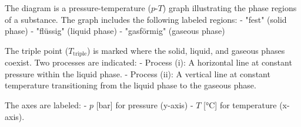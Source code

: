 The diagram is a pressure-temperature (\( p \)-\( T \)) graph illustrating the phase regions of a substance. The graph includes the following labeled regions:  
- "fest" (solid phase)  
- "flüssig" (liquid phase)  
- "gasförmig" (gaseous phase)  

The triple point (\( T_{\text{triple}} \)) is marked where the solid, liquid, and gaseous phases coexist. Two processes are indicated:  
- Process (i): A horizontal line at constant pressure within the liquid phase.  
- Process (ii): A vertical line at constant temperature transitioning from the liquid phase to the gaseous phase.  

The axes are labeled:  
- \( p \) [bar] for pressure (y-axis)  
- \( T \) [°C] for temperature (x-axis).